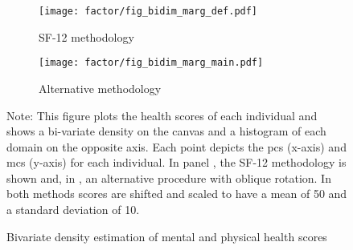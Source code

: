 \begin{figure}[tbhp!]
    \begin{subfigure}{.5\textwidth}\centering
        \texttt{[image: factor/fig\_bidim\_marg\_def.pdf]}
        \caption{SF-12 methodology}
        \label{sfig:dens_def}
    \end{subfigure}%
    \begin{subfigure}{.5\textwidth}\centering
        \texttt{[image: factor/fig\_bidim\_marg\_main.pdf]}
        \caption{Alternative methodology}
        \label{sfig:dens_main}
    \end{subfigure}
    \caption[Bivariate density of mental and physical health scores]
    {Bivariate density estimation of mental and physical health scores} \par \footnotesize
    \vspace{5pt} 
    Note: This figure plots the health scores of each individual and shows a bi-variate density on the canvas and a 
    histogram of each domain on the opposite axis. Each point depicts the pcs (x-axis) and mcs (y-axis) for each
    individual. In panel , the SF-12 methodology is shown and, in , an
    alternative procedure with oblique rotation. In both methods scores are shifted and scaled to have a 
    mean of 50 and a standard deviation of 10.
    \label{fig:main_bivariate_density}
\end{figure}